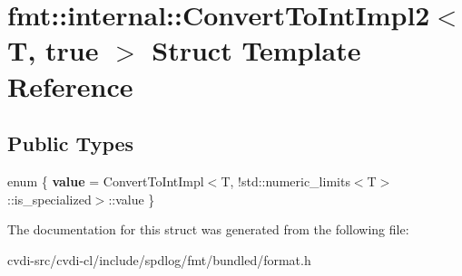 \hypertarget{structfmt_1_1internal_1_1ConvertToIntImpl2_3_01T_00_01true_01_4}{}\section{fmt\+:\+:internal\+:\+:Convert\+To\+Int\+Impl2$<$ T, true $>$ Struct Template Reference}
\label{structfmt_1_1internal_1_1ConvertToIntImpl2_3_01T_00_01true_01_4}
\subsection*{Public Types}
\begin{DoxyCompactItemize}
\item 
enum \{ {\bfseries value} = Convert\+To\+Int\+Impl$<$T, !std\+:\+:numeric\+\_\+limits$<$T$>$\+:\+:is\+\_\+specialized$>$\+:\+:value
 \}\hypertarget{structfmt_1_1internal_1_1ConvertToIntImpl2_3_01T_00_01true_01_4_a920c11529e79d60c9486c00f6c629570}{}\label{structfmt_1_1internal_1_1ConvertToIntImpl2_3_01T_00_01true_01_4_a920c11529e79d60c9486c00f6c629570}

\end{DoxyCompactItemize}


The documentation for this struct was generated from the following file\+:\begin{DoxyCompactItemize}
\item 
cvdi-\/src/cvdi-\/cl/include/spdlog/fmt/bundled/format.\+h\end{DoxyCompactItemize}
